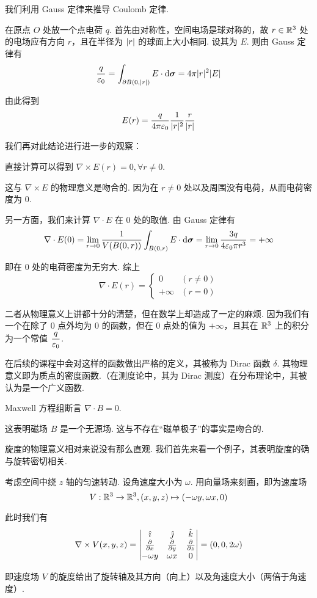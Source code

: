 \begin{example}[ Coulomb 定律]
    我们利用 Gauss 定律来推导 Coulomb 定律.

    在原点 $O$ 处放一个点电荷 $q$. 首先由对称性，空间电场是球对称的，故 $r\in\mathbb{R}^3$ 处的电场应有方向 $r$，且在半径为 $\lvert{r}\rvert$ 的球面上大小相同. 设其为 $E$. 则由 Gauss 定律有
$$
\frac{q}{\varepsilon_0}=\int_{\partial B(0,\lvert{r}\rvert)}E\cdot\mathrm{d}\bm{\sigma}=4\pi|r|^2|E|
$$

    由此得到
$$
E(r)=\frac{q}{4\pi\varepsilon_0}\frac{1}{\lvert{r}\rvert^2}\frac{r}{|r|}
$$

    我们再对此结论进行进一步的观察：

    直接计算可以得到 $\nabla\times E(r)=0,\forall r\ne 0$.

    这与 $\nabla\times E$ 的物理意义是吻合的. 因为在 $r\ne 0$ 处以及周围没有电荷，从而电荷密度为 $0$.

    另一方面，我们来计算 $\nabla\cdot E$ 在 $0$ 处的取值. 由 Gauss 定律有
$$
\nabla\cdot E(0)=\lim_{r\to 0}\frac{1}{V(B(0,r))}\int_{B(0,r)}E\cdot\mathrm{d}\bm{\sigma}=\lim_{r\to 0}\frac{3q}{4\varepsilon_0\pi r^3}=+\infty
$$

    即在 $0$ 处的电荷密度为无穷大. 综上
$$
\nabla\cdot E(r)=\begin{cases}
    0 & (r\ne 0)\\
    +\infty & (r=0)
\end{cases}
$$

    二者从物理意义上讲都十分的清楚，但在数学上却造成了一定的麻烦. 因为我们有一个在除了 $0$ 点外均为 $0$ 的函数，但在 $0$ 点处的值为 $+\infty$，且其在 $\mathbb{R}^3$ 上的积分为一个常值 $\dfrac{q}{\varepsilon_0}$.

    在后续的课程中会对这样的函数做出严格的定义，其被称为 Dirac 函数 $\delta$. 其物理意义即为质点的密度函数.（在测度论中，其为 Dirac 测度）在分布理论中，其被认为是一个广义函数.
\end{example}

\begin{example}
    Maxwell 方程组断言 $\nabla\cdot B=0$.

    这表明磁场 $B$ 是一个无源场. 这与不存在“磁单极子”的事实是吻合的.
\end{example}


旋度的物理意义相对来说没有那么直观. 我们首先来看一个例子，其表明旋度的确与旋转密切相关.

\begin{example}
    考虑空间中绕 $z$ 轴的匀速转动. 设角速度大小为 $\omega$. 用向量场来刻画，即为速度场
$$
V:\mathbb{R}^3\to\mathbb{R}^3,(x,y,z)\mapsto(-\omega y,\omega x,0)
$$


    此时我们有
$$
\nabla\times V(x,y,z)=\begin{vmatrix}
    \hat{\imath} & \hat{\jmath} & \hat{k}\\
    \frac{\partial{}}{\partial{x}} & \frac{\partial{}}{\partial{y}} & \frac{\partial{}}{\partial{z}}\\
    -\omega y & \omega x & 0    
\end{vmatrix}=(0,0,2\omega)
$$

    即速度场 $V$ 的旋度给出了旋转轴及其方向（向上）以及角速度大小（两倍于角速度）.
\end{example}

